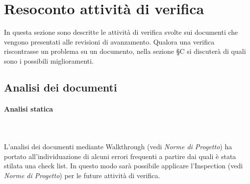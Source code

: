 \section{Resoconto attività di verifica}
In questa sezione sono descritte le attività di verifica svolte sui documenti che vengono presentati alle revisioni di avanzamento. Qualora una verifica riscontrasse un problema su un documento, nella sezione \S C si discuterà di quali sono i possibili miglioramenti.

\subsection{Analisi dei documenti}
\paragraph*{Analisi statica} \mbox{} \\ \mbox{} \\
L'analisi dei documenti mediante Walkthrough (vedi \textit{Norme di Progetto}) ha portato all'individuazione di alcuni errori frequenti a partire dai quali è stata stilata una check list. In questo modo sarà possibile applicare l’Inspection (vedi \textit{Norme di Progetto}) per le future attività di verifica.

